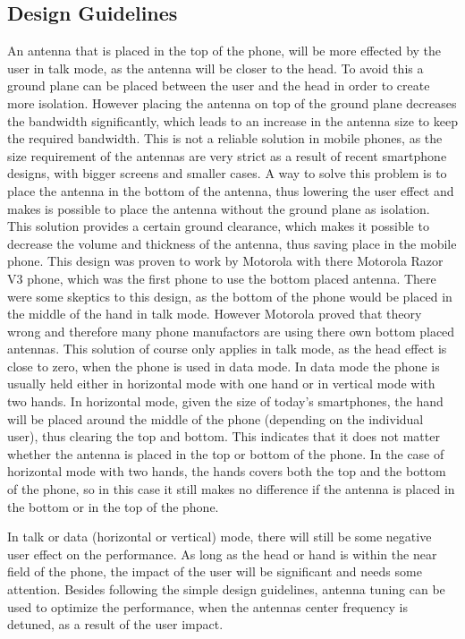 \subsection{Design Guidelines}
An antenna that is placed in the top of the phone, will be more effected by the user in talk mode, as the antenna will be closer to the head. To avoid this a ground plane can be placed between the user and the head in order to create more isolation. However placing the antenna on top of the ground plane decreases the bandwidth significantly, which leads to an increase in the antenna size to keep the required bandwidth. This is not a reliable solution in mobile phones, as the size requirement of the antennas are very strict as a result of recent smartphone designs, with bigger screens and smaller cases. A way to solve this problem is to place the antenna in the bottom of the antenna, thus lowering the user effect and makes is possible to place the antenna without the ground plane as isolation. This solution provides a certain ground clearance, which makes it possible to decrease the volume and thickness of the antenna, thus saving place in the mobile phone. 
This design was proven to work by Motorola with there Motorola Razor V3 phone, which was the first phone to use the bottom placed antenna. There were some skeptics to this design, as the bottom of the phone would be placed in the middle of the hand in talk mode. However Motorola proved that theory wrong and therefore many phone manufactors are using there own bottom placed antennas. This solution of course only applies in talk mode, as the head effect is close to zero, when the phone is used in data mode. In data mode the phone is usually held either in horizontal mode with one hand or in vertical mode with two hands. In horizontal mode, given the size of today's smartphones, the hand will be placed around the middle of the phone (depending on the individual user), thus clearing the top and bottom. This indicates that it does not matter whether the antenna is placed in the top or bottom of the phone. In the case of horizontal mode with two hands, the hands covers both the top and the bottom of the phone, 
so in this case it still makes no difference if the antenna is placed in the bottom or in the top of the phone. 


In talk or data (horizontal or vertical) mode, there will still be some negative user effect on the performance. As long as the head or hand is within the near field of the phone, the impact of the user will be significant and needs some attention. Besides following the simple design guidelines, antenna tuning can be used to optimize the performance, when the antennas center frequency is detuned, as a result of the user impact.

